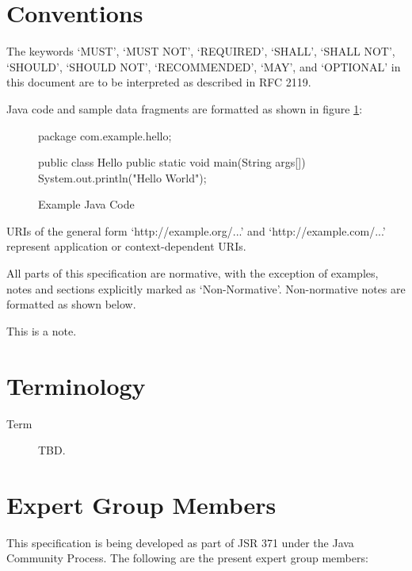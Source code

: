 \section{Conventions}

The keywords `MUST', `MUST NOT', `REQUIRED', `SHALL', `SHALL NOT', `SHOULD', `SHOULD NOT', `RECOMMENDED', `MAY',
and `OPTIONAL' in this document are to be interpreted as described in RFC 2119\cite{rfc2119}. 

Java code and sample data fragments are formatted as shown in figure \ref{ex1}:

\begin{figure}[hbtp]
\caption{Example Java Code}
\label{ex1}
\begin{listing}{1}
package com.example.hello;

public class Hello {
    public static void main(String args[]) {
        System.out.println("Hello World");
    }
}\end{listing}
\end{figure}

URIs of the general form `http://example.org/...' and `http://example.com/...' represent application or
 context-dependent URIs.

All parts of this specification are normative, with the exception of examples, notes and sections explicitly
 marked as `Non-Normative'. Non-normative notes are formatted as shown below.

\begin{nnnote*}
This is a note.
\end{nnnote*}

\section{Terminology}
\label{terminology}

\begin{description}
\item[Term] TBD.
\end{description}

\section{Expert Group Members} 
\label{expert_group}

This specification is being developed as part of JSR 371 under the Java Community Process. The following are the present expert
group members:

